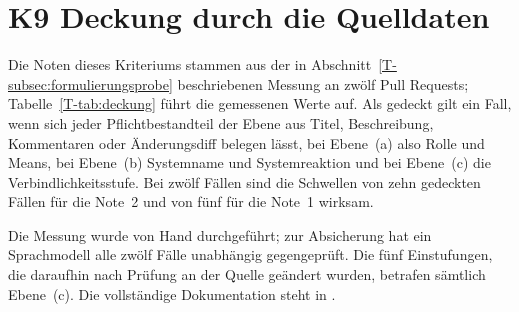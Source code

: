 \documentclass[11pt,a4paper]{report}
\begin{document}
\section{K9 Deckung durch die Quelldaten}
\label{sec:anhang-k9}

Die Noten dieses Kriteriums stammen aus der in
Abschnitt~\ref{T-subsec:formulierungsprobe} beschriebenen Messung an zwölf
Pull Requests; Tabelle~\ref{T-tab:deckung} führt die gemessenen Werte auf.
Als gedeckt gilt ein Fall, wenn sich jeder Pflichtbestandteil der Ebene
aus Titel, Beschreibung, Kommentaren oder Änderungsdiff belegen lässt,
bei Ebene~(a) also Rolle und Means, bei Ebene~(b) Systemname und
Systemreaktion und bei Ebene~(c) die Verbindlichkeitsstufe. Bei zwölf
Fällen sind die Schwellen von zehn gedeckten Fällen für die Note~2 und
von fünf für die Note~1 wirksam.

Die Messung wurde von Hand durchgeführt; zur Absicherung hat ein
Sprachmodell alle zwölf Fälle unabhängig gegengeprüft. Die fünf
Einstufungen, die daraufhin nach Prüfung an der Quelle geändert
wurden, betrafen sämtlich Ebene~(c). Die vollständige
Dokumentation steht in .
\end{document}
